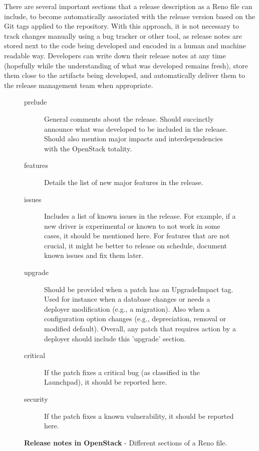 \documentclass[dvipsnames]{bmcart}
\theoremstyle{definition}
\begin{document}
There are several important sections that a release description as a Reno file can include, to become automatically associated with the release version based on the Git tags applied to the repository. With this approach, it is not necessary to track changes manually using a bug tracker or other tool,  as release notes are stored next to the code being developed and encoded in a human and machine readable way. Developers can write down their release notes at any time (hopefully while the understanding of what was developed remains fresh),  store them close to the artifacts being developed, and automatically deliver them to the release management team when appropriate.  

    
    \begin{figure}[bh]
    \footnotesize
\begin{description}


\item[prelude]
    General comments about the release. Should succinctly announce what was developed to be included in the release. Should also mention major impacts and interdependencies with the OpenStack totality. 
    
\item[features]
    Details the list of new major features in the release.
    
\item[issues]
    Includes a list of known issues in the release. For example, if a new driver is experimental or known to not work in some cases, it should be mentioned here. For features that are not crucial, it might be better to release on schedule, document known issues and fix them later. 

\item[upgrade]  Should be provided when a  patch has an UpgradeImpact tag. Used for instance when a database changes or needs a deployer modification (e.g., a migration). Also when a configuration option changes (e.g., depreciation, removal or modified default). Overall, any patch that requires action by a deployer should include this 'upgrade' section. 

 \item[critical]  If the patch fixes a critical bug (as classified in the Launchpad), it should be reported here. 

\item[security] If the patch fixes a known vulnerability, it should be reported here.  


\end{description}

\vspace{0.2cm}

\raggedright{\sffamily  \par \textbf{Release notes in OpenStack} - Different sections of a Reno file. }
    \end{figure}
\end{document}
